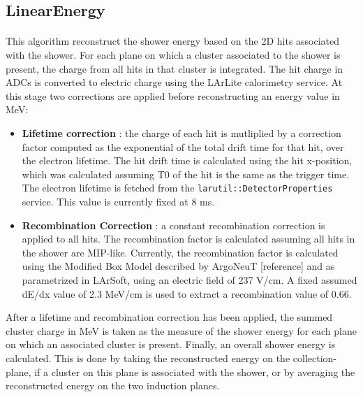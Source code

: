 \subsection{LinearEnergy}
\paragraph{}This algorithm reconstruct the shower energy based on the 2D hits associated with the shower. For each plane on which a cluster associated to the shower is present, the charge from all hits in that cluster is integrated. The hit charge in ADCs is converted to electric charge using the LArLite calorimetry service. At this stage two corrections are applied before reconstructing an energy value in MeV:
\begin{itemize}
\item \textbf{Lifetime correction} : the charge of each hit is mutliplied by a correction factor computed as the exponential of the total drift time for that hit, over the electron lifetime. The hit drift time is calculated using the hit x-position, which was calculated assuming T0 of the hit is the same as the trigger time. The electron lifetime is fetched from the \texttt{larutil::DetectorProperties} service. This value is currently fixed at 8 ms.
\item \textbf{Recombination Correction} : a constant recombination correction is applied to all hits. The recombination factor is calculated assuming all hits in the shower are MIP-like. Currently, the recombination factor is calculated using the Modified Box Model described by ArgoNeuT {\color{red} [reference]} and as parametrized in LArSoft, using an electric field of 237 V/cm. A fixed assumed dE/dx value of 2.3 MeV/cm is used to extract a recombination value of 0.66.
\end{itemize}
After a lifetime and recombination correction has been applied, the summed cluster charge in MeV is taken as the measure of the shower energy for each plane on which an associated cluster is present. Finally, an overall shower energy is calculated. This is done by taking the reconstructed energy on the collection-plane, if a cluster on this plane is associated with the shower, or by averaging the reconstructed energy on the two induction planes.
